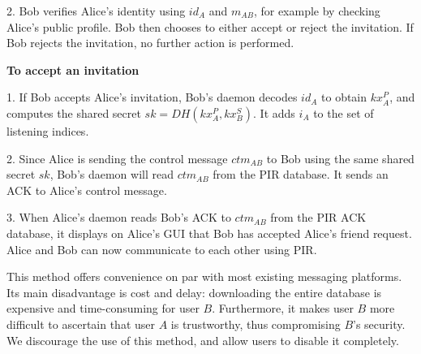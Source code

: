2. Bob verifies Alice's identity using $id_A$ and $m_{AB}$, for example by checking Alice's public profile. Bob then chooses to either accept or reject the invitation. If Bob rejects the invitation, no further action is performed. 

\textbf{To accept an invitation}

1. If Bob accepts Alice's invitation, Bob's daemon decodes $id_A$ to obtain $kx_A^P$, and computes the shared secret $sk = DH(kx_A^P, kx_B^S)$. It adds $i_A$ to the set of listening indices.

2. Since Alice is sending the control message $ctm_{AB}$ to Bob using the same shared secret $sk$, Bob's daemon will read $ctm_{AB}$ from the PIR database. It sends an ACK to Alice's control message.

3. When Alice's daemon reads Bob's ACK to $ctm_{AB}$ from the PIR ACK database, it displays on Alice's GUI that Bob has accepted Alice's friend request. Alice and Bob can now communicate to each other using PIR.

This method offers convenience on par with most existing messaging platforms. Its main disadvantage is cost and delay: downloading the entire database is expensive and time-consuming for user $B$. Furthermore, it makes user $B$ more difficult to ascertain that user $A$ is trustworthy, thus compromising $B$'s security. We discourage the use of this method, and allow users to disable it completely. 
